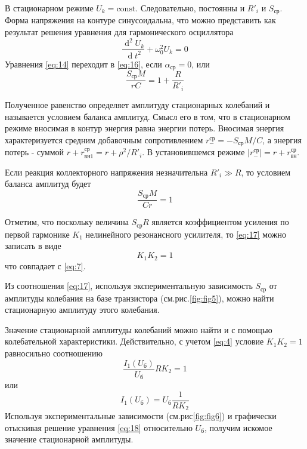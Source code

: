 В стационарном режиме $U_k=\text{const}$. Следовательно, постоянны и $R'_i$ и $S_\text{ср}$. Форма напряжения на контуре синусоидальна, что можно представить как результат решения уравнения для гармонического осциллятора
\begin{equation}
\frac{\operatorname d^2U_k}{\operatorname dt^2}+\omega_0^2U_k=0
\label{eq:16}
\end{equation}
Уравнения \eqref{eq:14} переходит в \eqref{eq:16}, если $\alpha_\text{ср}=0$, или
\begin{equation*}
\frac{S_\text{ср}M}{rC}=1+\frac{R}{R'_i}
\end{equation*}

Полученное равенство определяет амплитуду стационарных колебаний и называется условием баланса амплитуд. Смысл его в том, что в стационарном режиме вносимая в контур энергия равна энергии потерь. Вносимая энергия характеризуется средним добавочным сопротивлением $r^\text{ср}_{-}=-S_\text{ср}M/C$, а энергия потерь - суммой $r+r^\text{ср}_{\text{вн}1}=r+\rho^2/R'_i$. В установившемся режиме $|r^\text{ср}_{-}|=r+r^\text{ср}_\text{вн}$.

Если реакция коллекторного напряжения незначительна $R'_i\gg R$, то условием баланса амплитуд будет
\begin{equation}
\frac{S_\text{ср}M}{Cr}=1
\label{eq:17}
\end{equation}

Отметим, что поскольку величина $S_\text{ср}R$ является коэффициентом усиления по первой гармонике $K_1$ нелинейного резонансного усилителя, то \eqref{eq:17} можно записать в виде
\begin{equation*}
K_1K_2=1
\end{equation*}
что совпадает с \eqref{eq:7}.

Из соотношения \eqref{eq:17}, используя экспериментальную зависимость $S_\text{ср}$ от амплитуды колебания на базе транзистора (см.рис.\ref{fig:fig5}), можно найти стационарную амплитуду этого колебания.

Значение стационарной амплитуды колебаний можно найти и с помощью колебательной характеристики. Действительно, с учетом \eqref{eq:4} условие $K_1K_2=1$ равносильно соотношению
\begin{equation*}
\frac{I_1(U_\text{б})}{U_\text{б}}RK_2=1
\end{equation*}
или
\begin{equation}
I_1(U_\text{б})=U_\text{б}\frac{1}{RK_2}
\label{eq:18}
\end{equation}
Используя экспериментальные зависимости (см.рис\ref{fig:fig6}) и графически отыскивая решение уравнения \eqref{eq:18} относительно $U_\text{б}$, получим искомое значение стационарной амплитуды.


